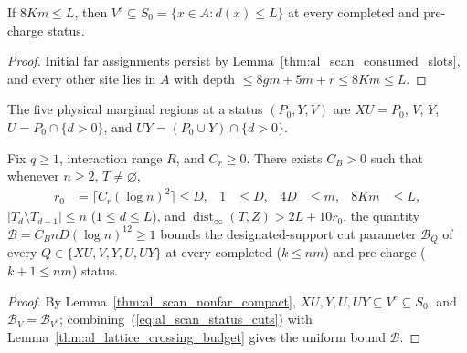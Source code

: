\begin{lemma}
    \label{thm:al_scan_nonfar_compact}
    If $8Km\le L$, then $V^c\subseteq S_0=\{x\in A:d(x)\le L\}$ at every
    completed and pre-charge status.
\end{lemma}
\begin{proof}
    Initial far assignments persist by Lemma~\ref{thm:al_scan_consumed_slots},
    and every other site lies in $A$ with depth $\le 8gm+5m+r\le 8Km\le L$.
\end{proof}

\begin{definition}
    \label{def:al_scan_status_marginals}
    The five physical marginal regions at a status $(P_0,Y,V)$ are
    $XU=P_0$, $V$, $Y$, $U=P_0\cap\{d>0\}$, and $UY=(P_0\cup Y)\cap\{d>0\}$.
\end{definition}

\begin{lemma}
    \label{thm:al_scan_common_status_budget}
    Fix $q\ge1$, interaction range $R$, and $C_r\ge0$. There exists $C_B>0$
    such that whenever $n\ge2$, $T\ne\varnothing$,
    \begin{align}
        r_0 & =\lceil C_r(\log n)^2\rceil\le D, & 1 & \le D, & 4D & \le m, & 8Km & \le L,
        \label{eq:al_scan_common_status_scales}
    \end{align}
    $|T_d\setminus T_{d-1}|\le n$ ($1\le d\le L$), and
    $\operatorname{dist}_\infty(T,Z)>2L+10r_0$, the quantity
    $\mathcal B=C_BnD(\log n)^{12}\ge1$ bounds the designated-support cut
    parameter $\mathcal B_Q$ of every $Q\in\{XU,V,Y,U,UY\}$ at every completed
    ($k\le nm$) and pre-charge ($k+1\le nm$) status.
\end{lemma}
\begin{proof}
    By Lemma~\ref{thm:al_scan_nonfar_compact}, $XU,Y,U,UY\subseteq V^c\subseteq S_0$,
    and $\mathcal B_V=\mathcal B_{V^c}$; combining~(\ref{eq:al_scan_status_cuts})
    with Lemma~\ref{thm:al_lattice_crossing_budget} gives the uniform bound
    $\mathcal B$.
\end{proof}

